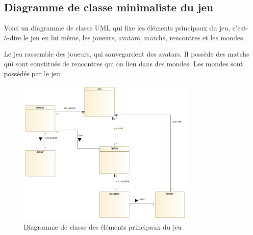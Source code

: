 
\subsection{Diagramme de classe minimaliste du jeu}
\label{sec:question-1}

Voici un diagramme de classe UML qui fixe les éléments principaux du jeu, c'est-à-dire le jeu en lui même, les joueurs, avatars, matchs, rencontres et les mondes.

Le jeu rassemble des joueurs, qui sauvegardent des avatars. Il possède des matchs qui sont constitués de rencontres qui on lieu dans des mondes. Les mondes sont possédés par le jeu.

\begin{figure}[h!]
	\centering
	\includegraphics[width=250pt]{assets/diagrammeclassebase}
	\caption{Diagramme de classe des éléments principaux du jeu}
	\label{fig:diagrammeclassebase}
\end{figure}

\newpage